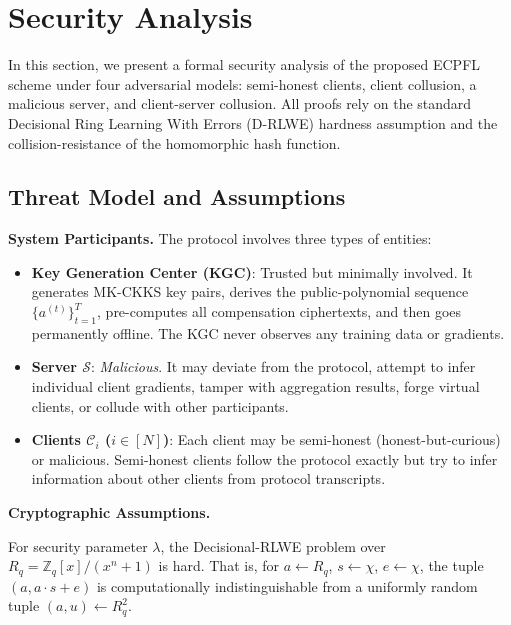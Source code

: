 \section{Security Analysis}
\label{sec:security}

In this section, we present a formal security analysis of the proposed \textsc{ECPFL} scheme under four adversarial models: semi-honest clients, client collusion, a malicious server, and client-server collusion. All proofs rely on the standard Decisional Ring Learning With Errors (D-RLWE) hardness assumption and the collision-resistance of the homomorphic hash function.

\subsection{Threat Model and Assumptions}
\label{ssec:threat-model}

\noindent\textbf{System Participants.}
The protocol involves three types of entities:
\begin{itemize}
    \item \textbf{Key Generation Center (KGC)}: Trusted but minimally involved. It generates MK-CKKS key pairs, derives the public-polynomial sequence $\{a^{(t)}\}_{t=1}^{T}$, pre-computes all compensation ciphertexts, and then goes permanently offline. The KGC never observes any training data or gradients.
    \item \textbf{Server $\mathcal{S}$}: \emph{Malicious}. It may deviate from the protocol, attempt to infer individual client gradients, tamper with aggregation results, forge virtual clients, or collude with other participants.
    \item \textbf{Clients $\mathcal{C}_i$ ($i \in [N]$)}: Each client may be semi-honest (honest-but-curious) or malicious. Semi-honest clients follow the protocol exactly but try to infer information about other clients from protocol transcripts.
\end{itemize}

\noindent\textbf{Cryptographic Assumptions.}
\begin{assumption}
\label{ass:rlwe}
For security parameter $\lambda$, the Decisional-RLWE problem over $R_q = \mathbb{Z}_q[x]/(x^n+1)$ is hard. That is, for $a \gets R_q$, $s \gets \chi$, $e \gets \chi$, the tuple $(a, a \cdot s + e)$ is computationally indistinguishable from a uniformly random tuple $(a, u) \gets R_q^2$.
\end{assumption}

